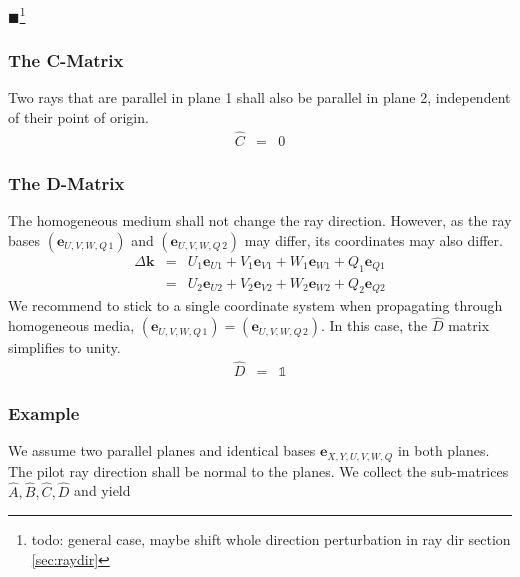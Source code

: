\documentclass[12pt,a4paper,twoside,openright,BCOR10mm,headsepline,titlepage,abstracton,chapterprefix,final]{scrreprt}
\newcommand\Vector[1]{{\mathbf{#1}}}
\newcommand\wavenumber{k}
\newcommand\Wavevector{\Vector{\wavenumber}}
\newcommand\unittensor{\mathds{1}}
\newcommand{\remark}[1]{{\color{red}$\blacksquare$}\footnote{{\color{red}#1}}}
\begin{document}
\remark{todo: general case, maybe shift whole direction perturbation in ray dir section \ref{sec:raydir}}

\subsubsection{The C-Matrix} 
Two rays that are parallel in plane 1 shall also be parallel in plane 2, 
independent of their point of origin.
\begin{eqnarray}
\hat{C} &=& 0 
\end{eqnarray}

\subsubsection{The D-Matrix}
The homogeneous medium shall not change the ray direction.
However, as the ray bases $( \Vector{e}_{U,V,W,Q\,1} )$ and $( \Vector{e}_{U,V,W,Q\,2} )$
may differ, its coordinates may also differ.
\begin{eqnarray}
 \Delta \Wavevector 
 &=& U_1 \Vector{e}_{U1} + V_1 \Vector{e}_{V1} + W_1 \Vector{e}_{W1} + Q_1 \Vector{e}_{Q1} \nonumber \\
 &=& U_2 \Vector{e}_{U2} + V_2 \Vector{e}_{V2} + W_2 \Vector{e}_{W2} + Q_2 \Vector{e}_{Q2}
\end{eqnarray}
We recommend to stick to a single coordinate system when propagating through homogeneous media, 
$( \Vector{e}_{U,V,W,Q\,1} ) = ( \Vector{e}_{U,V,W,Q\,2} )$. 
In this case, the $\hat{D}$ matrix simplifies to unity.
\begin{eqnarray}
 \hat{D} &=& \unittensor
\end{eqnarray}


\subsubsection{Example}
We assume two parallel planes and identical bases $\Vector{e}_{X,Y,U,V,W,Q}$ in both planes. 
The pilot ray direction shall be normal to the planes.
We collect the sub-matrices $\hat{A}, \hat{B}, \hat{C}, \hat{D}$ and yield
\end{document}
